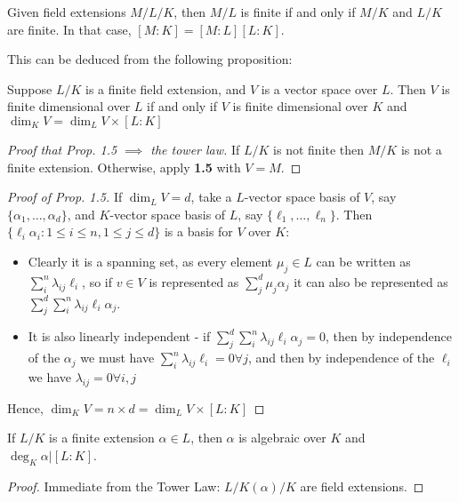 \documentclass[10pt,a4paper]{article}
\begin{document}
\begin{theorem}
Given field extensions $M/L/K$, then $M/L$ is finite if and only if $M/K$ and $L/K$ are finite. In that case, $[M:K]=[M:L][L:K]$.
\end{theorem}
This can be deduced from the following proposition:
\begin{proposition}
Suppose $L/K$ is a finite field extension, and $V$ is a vector space over $L$. Then $V$ is finite dimensional over $L$ if and only if $V$ is finite dimensional over $K$ and $\dim_K V = \dim_L V\times[L:K]$
\end{proposition}
\begin{proof}[Proof that Prop. 1.5 $\implies$ the tower law]
If $L/K$ is not finite then $M/K$ is not a finite extension. Otherwise, apply \textbf{1.5} with $V=M$.
\end{proof}
\begin{proof}[Proof of Prop. 1.5]
If $\dim_L V = d$, take a $L$-vector space basis of $V$, say $\{\alpha_1, \ldots, \alpha_d\}$, and $K$-vector space basis of $L$, say $\{\ell_1, \ldots, \ell_n\}$. Then $\{\ell_i\alpha_i : 1\leq i \leq n, 1 \leq j \leq d\}$ is a basis for $V$ over $K$: 
\begin{itemize}
\item Clearly it is a spanning set, as every element $\mu_j \in L$ can be written as $\sum_i^n \lambda_{ij}\ell_i$, so if $v\in V$ is represented as $\sum_j^d \mu_j \alpha_j$ it can also be represented as $\sum_j^d\sum_i^n \lambda_{ij}\ell_i \alpha_j$.
\item It is also linearly independent - if $\sum_j^d \sum_i^n \lambda_{ij}\ell_i \alpha_j = 0$, then by independence of the $\alpha_j$ we must have $\sum_i^n \lambda_{ij}\ell_i = 0\forall j$, and then by independence of the $\ell_i$ we have $\lambda_{ij} = 0 \forall i,j$
\end{itemize}
Hence, $\dim_K V = n\times d = \dim_L V\times[L:K]$
\end{proof}

\begin{corollary}
If $L/K$ is a finite extension $\alpha \in L$, then $\alpha$ is algebraic over $K$ and $\deg_K \alpha | [L:K]$.
\end{corollary}
\begin{proof}
Immediate from the Tower Law: $L/K(\alpha)/K$ are field extensions.
\end{proof}
\end{document}
